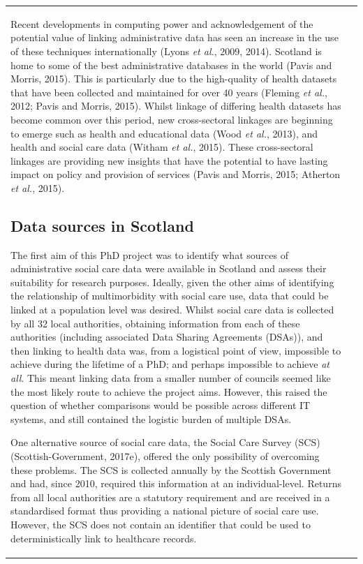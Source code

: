\documentclass[12pt,a4paper,oneside,table]{report}
\begin{document}
\begin{tabular}[t]{ll}
Recent developments in computing power and acknowledgement of the
potential value of linking administrative data has seen an increase in
the use of these techniques internationally (Lyons \emph{et al.}, 2009,
2014). Scotland is home to some of the best administrative databases in
the world (Pavis and Morris, 2015). This is particularly due to the
high-quality of health datasets that have been collected and maintained
for over 40 years (Fleming \emph{et al.}, 2012; Pavis and Morris, 2015).
Whilst linkage of differing health datasets has become common over this
period, new cross-sectoral linkages are beginning to emerge such as
health and educational data (Wood \emph{et al.}, 2013), and health and
social care data (Witham \emph{et al.}, 2015). These cross-sectoral
linkages are providing new insights that have the potential to have
lasting impact on policy and provision of services (Pavis and Morris,
2015; Atherton \emph{et al.}, 2015).

\subsection{Data sources in Scotland}\label{subsec-litrv-linkage-sources}

The first aim of this PhD project was to identify what sources of
administrative social care data were available in Scotland and assess
their suitability for research purposes. Ideally, given the other aims
of identifying the relationship of multimorbidity with social care use,
data that could be linked at a population level was desired. Whilst
social care data is collected by all 32 local authorities, obtaining
information from each of these authorities (including associated Data
Sharing Agreements (DSAs)), and then linking to health data was, from a
logistical point of view, impossible to achieve during the lifetime of a
PhD; and perhaps impossible to achieve \emph{at all}. This meant linking
data from a smaller number of councils seemed like the most likely route
to achieve the project aims. However, this raised the question of
whether comparisons would be possible across different IT systems, and
still contained the logistic burden of multiple DSAs.

One alternative source of social care data, the Social Care Survey (SCS)
(Scottish-Government, 2017e), offered the only possibility of overcoming
these problems. The SCS is collected annually by the Scottish Government
and had, since 2010, required this information at an individual-level.
Returns from all local authorities are a statutory requirement and are
received in a standardised format thus providing a national picture of
social care use. However, the SCS does not contain an identifier that
could be used to deterministically link to healthcare records.


\end{tabular}
\end{document}
